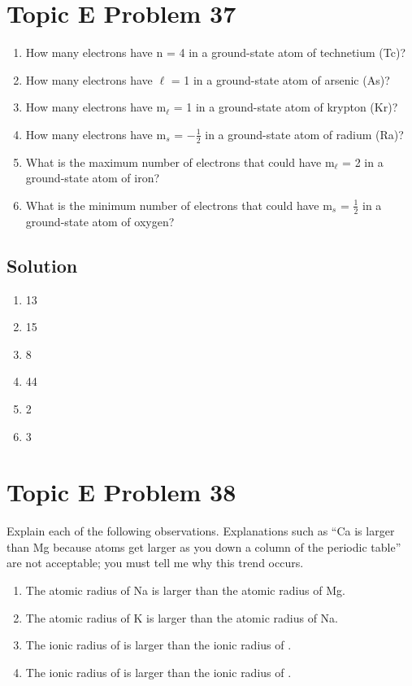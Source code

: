 \documentclass[10pt]{article}
\begin{document}
    \section{Topic E Problem 37}
        \begin{enumerate}[label=\alph*)]
            \item   How many electrons have n = 4 in a ground-state atom of technetium (Tc)?
            \item   How many electrons have $\ell$ = 1 in a ground-state atom of arsenic (As)?
            \item   How many electrons have m$_\ell$ = 1 in a ground-state atom of krypton (Kr)?
            \item   How many electrons have m$_s$ = $-\frac{1}{2}$ in a ground-state atom of radium (Ra)?
            \item   What is the maximum number of electrons that could have m$_\ell$ = 2 in a ground-state atom of iron?
            \item   What is the minimum number of electrons that could have m$_s$ = $\frac{1}{2}$ in a ground-state atom of oxygen?
        \end{enumerate}

        \subsection{Solution}
            \begin{multicols}{3}
                \begin{enumerate}[label=\alph*)]
                    \item   13
                    \item   15
                    \item   8
                    \item   44
                    \item   2
                    \item   3
                \end{enumerate}
            \end{multicols}


    \pagebreak
    \section{Topic E Problem 38}
        Explain each of the following observations. 
        Explanations such as “Ca is larger than Mg because atoms get larger as you down a column of the periodic table” are not acceptable; you must tell me why this trend occurs.
        \begin{enumerate}[label=\alph*)]
            \item   The atomic radius of Na is larger than the atomic radius of Mg.
            \item   The atomic radius of K is larger than the atomic radius of Na.
            \item   The ionic radius of  is larger than the ionic radius of .
            \item   The ionic radius of  is larger than the ionic radius of .
        \end{enumerate}
\end{document}
